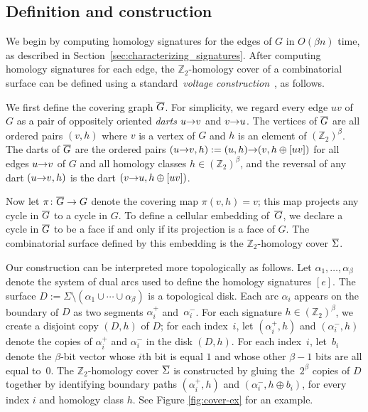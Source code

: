 \documentclass[letterpaper,review]{siamart190516}
\def\arcto{\mathord\shortrightarrow}
\def\arc#1#2{#1\arcto#2}
\def\Z{\mathbb{Z}}
\def\dualarc{\alpha}
\def\Sigmabar{\overline{\smash{\Sigma}\vphantom{t}}}
\def\Gbar{\overline{\smash{G}\vphantom{t}}}
\begin{document}
\subsection{Definition and construction}
\label{sec:homcover_cover}

We begin by computing homology signatures for the edges of $G$ in $O(\beta n)$ time, as described in Section~\ref{sec:characterizing_signatures}.
After computing homology signatures for each edge, the $\Z_2$-homology cover of a combinatorial surface can be defined using a standard~\emph{voltage construction}~\cite[Chapter 4]{gt-tgt-01}, as follows.

We first define the covering graph $\Gbar$.  For simplicity, we regard every edge $uv$ of $G$ as a pair of oppositely oriented \emph{darts} $\arc{u}{v}$ and $\arc{v}{u}$.  The vertices of $\Gbar$ are all ordered pairs $(v, h)$ where $v$ is a vertex of $G$ and $h$ is an element of $(\Z_2)^\beta$.  The darts of $\Gbar$ are the ordered pairs $(\arc{u}{v}, h) := (u, h)\arcto(v, h\oplus [uv])$ for all edges $\arc{u}{v}$ of $G$ and all homology classes $h \in (\Z_2)^\beta$, and the reversal of any dart $(\arc{u}{v}, h)$ is the dart $(\arc{v}{u}, h\oplus[uv])$.

Now let $\pi\colon \Gbar\to G$ denote the covering map $\pi(v, h) = v$; this map projects any cycle in $\Gbar$ to a cycle in $G$.  To define a cellular embedding of~$\Gbar$, we declare a cycle in $\Gbar$ to be a face if and only if its projection is a face of $G$.  The combinatorial surface defined by this embedding is the $\Z_2$-homology cover $\Sigmabar$.

Our construction can be interpreted more topologically as follows.  Let $\dualarc_1, \dots, \dualarc_\beta$ denote the system of dual arcs used to define the homology signatures $[e]$.  The surface $D := \Sigma\setminus(\dualarc_1\cup\cdots\cup \dualarc_\beta)$ is a topological disk.  Each arc $\dualarc_i$ appears on the boundary of $D$ as two segments $\dualarc^+_i$ and~$\dualarc^-_i$.  For each signature $h\in (\Z_2)^\beta$, we create a disjoint copy $(D,h)$ of $D$; for each index~$i$, let $(\dualarc^+_i, h)$ and $(\dualarc^-_i, h)$ denote the copies of $\dualarc^+_i$ and $\dualarc^-_i$ in the disk $(D, h)$.  For each index~$i$, let~$b_i$ denote the $\beta$-bit vector whose $i$th bit is equal $1$ and whose other $\beta-1$ bits are all equal to~$0$.  The $\Z_2$-homology cover $\Sigmabar$ is constructed by gluing the~$2^\beta$ copies of $D$ together by identifying boundary paths $(\dualarc^+_i,h)$ and $(\dualarc^-_i, h\oplus b_i)$, for every index $i$ and homology class $h$.  See Figure \ref{fig:cover-ex} for an example.
\end{document}
